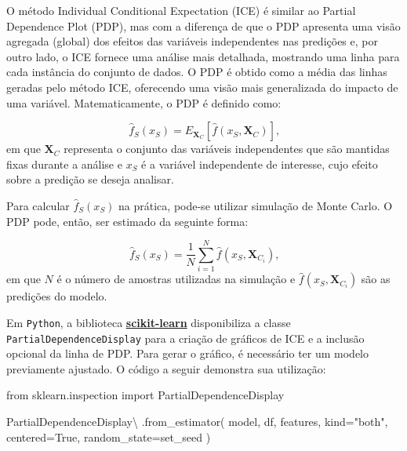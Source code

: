 \documentclass[
  12pt,
  a4paper,
]{scrreprt}
\newenvironment{Shaded}{}{}
\newcommand{\ImportTok}[1]{\textcolor[rgb]{0.01,0.18,0.38}{#1}}
\newcommand{\NormalTok}[1]{\textcolor[rgb]{0.14,0.16,0.18}{#1}}
\newcommand{\OperatorTok}[1]{\textcolor[rgb]{0.14,0.16,0.18}{#1}}
\newcommand{\StringTok}[1]{\textcolor[rgb]{0.01,0.18,0.38}{#1}}
\newcommand{\VariableTok}[1]{\textcolor[rgb]{0.89,0.38,0.04}{#1}}
\begin{document}
\vspace{12pt}

O método Individual Conditional Expectation (ICE) é similar ao Partial
Dependence Plot (PDP), mas com a diferença de que o PDP apresenta uma
visão agregada (global) dos efeitos das variáveis independentes nas
predições e, por outro lado, o ICE fornece uma análise mais detalhada,
mostrando uma linha para cada instância do conjunto de dados. O PDP é
obtido como a média das linhas geradas pelo método ICE, oferecendo uma
visão mais generalizada do impacto de uma variável. Matematicamente, o
PDP é definido como:

\[
\hat{f}_{S}\left(x_{S}\right) = E_{\mathbf{X}_{C}}\left[\hat{f}\left(x_{S}, \mathbf{X}_{C}\right)\right]\text{,}
\] em que \(\mathbf{X}_C\) representa o conjunto das variáveis
independentes que são mantidas fixas durante a análise e \(x_S\) é a
variável independente de interesse, cujo efeito sobre a predição se
deseja analisar.

\vspace{12pt}

Para calcular \(\hat{f}_S\left(x_S\right)\) na prática, pode-se utilizar
simulação de Monte Carlo. O PDP pode, então, ser estimado da seguinte
forma:

\[
\hat{f}_S\left(x_S\right) = \frac{1}{N} \sum^{N}_{i=1}\hat{f}\left(x_{S}, \mathbf{X}_{C_i}\right)\text{,}
\] em que \(N\) é o número de amostras utilizadas na simulação e
\(\hat{f}\left(x_{S}, \mathbf{X}_{C_i}\right)\) são as predições do
modelo.

\vspace{12pt}

Em \texttt{Python}, a biblioteca
\href{https://scikit-learn.org/stable/}{\textbf{scikit-learn}}
disponibiliza a classe \texttt{PartialDependenceDisplay} para a criação
de gráficos de ICE e a inclusão opcional da linha de PDP. Para gerar o
gráfico, é necessário ter um modelo previamente ajustado. O código a
seguir demonstra sua utilização:

\begin{Shaded}
\begin{Highlighting}[]
\ImportTok{from}\NormalTok{ sklearn.inspection }\ImportTok{import}\NormalTok{ PartialDependenceDisplay}

\NormalTok{PartialDependenceDisplay}\OperatorTok{\textbackslash{}}
\NormalTok{    .from\_estimator(}
\NormalTok{        model,}
\NormalTok{        df,}
\NormalTok{        features,}
\NormalTok{        kind}\OperatorTok{=}\StringTok{"both"}\NormalTok{,}
\NormalTok{        centered}\OperatorTok{=}\VariableTok{True}\NormalTok{,}
\NormalTok{        random\_state}\OperatorTok{=}\NormalTok{set\_seed}
\NormalTok{    )}
\end{Highlighting}
\end{Shaded}
\end{document}

